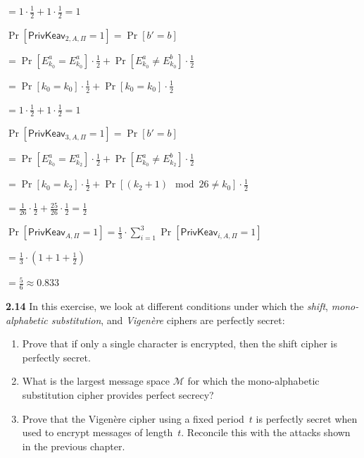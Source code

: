 \begin{enumerate}
	$= 1 \cdot \frac{1}{2} + 1 \cdot \frac{1}{2} = 1$
	
	$\Pr[\mathsf{PrivKeav}_{2,A,\Pi}=1] = \Pr[b' = b]$
	
	$= \Pr[E_{k_0}^{a}  = E_{k_0}^{a}] \cdot \frac{1}{2} + \Pr[E_{k_0}^{a} \ne E_{k_0}^{b}] \cdot \frac{1}{2}$
	
	$= \Pr[k_0  = k_0] \cdot \frac{1}{2} +  \Pr[k_0  = k_0] \cdot \frac{1}{2}$
	
	$= 1 \cdot \frac{1}{2} + 1 \cdot \frac{1}{2} = 1$
	
	$\Pr[\mathsf{PrivKeav}_{3,A,\Pi}=1] = \Pr[b' = b]$
	
	$= \Pr[E_{k_0}^{a}  = E_{k_2}^{a}] \cdot \frac{1}{2} + \Pr[E_{k_0}^{a} \ne E_{k_2}^{b}] \cdot \frac{1}{2}$
	
	$= \Pr[k_0  = k_2] \cdot \frac{1}{2} + \Pr[(k_2 + 1) \mod 26 \ne k_0 ] \cdot \frac{1}{2}$
	
	$= \frac{1}{26} \cdot \frac{1}{2} + \frac{25}{26} \cdot \frac{1}{2} = \frac{1}{2}$
	
	$\Pr[\mathsf{PrivKeav}_{A,\Pi}=1] = \frac{1}{3} \cdot \sum_{i=1}^{3} \Pr[\mathsf{PrivKeav}_{i,A,\Pi}=1]$
	
	$=  \frac{1}{3} \cdot (1 +  1 +  \frac{1}{2})$
	
	$= \frac{5}{6} \approx 0.833$
\end{enumerate}


\newpage
\noindent
\textbf{2.14} \hspace{1em} In this exercise, we look at different conditions under which the \emph{shift}, \emph{mono-alphabetic substitution}, and \emph{Vigen\`ere} ciphers are perfectly secret:
\vspace{1em}

\begin{enumerate}
	\item[(a)] Prove that if only a single character is encrypted, then the shift cipher is perfectly secret.
	\item[(b)] What is the largest message space $\mathcal{M}$ for which the mono-alphabetic substitution cipher provides perfect secrecy?
	\item[(c)] Prove that the Vigen\`ere cipher using a fixed period~$t$ is perfectly secret when used to encrypt messages of length~$t$.
	Reconcile this with the attacks shown in the previous chapter.
\end{enumerate}

